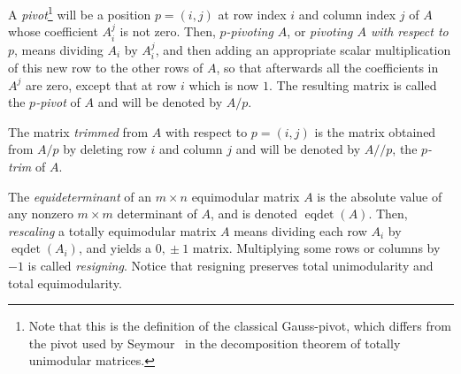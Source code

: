 \documentclass[11pt,a4paper]{amsart}
\theoremstyle{plain}
\theoremstyle{definition}
\DeclareMathOperator{\eqdet}{eqdet}
\newcommand{\trim}{/\!\!/}
\begin{document}
A {\em pivot}\footnote{Note that this is the definition of the classical Gauss-pivot, which differs from the pivot used by Seymour~\cite{Seymour1980} in the decomposition theorem of totally unimodular matrices.} will be a position $p=(i,j)$ at row index $i$ and column index $j$ of $A$ whose coefficient $A_i^j$ is not zero.
Then, {\em $p$-pivoting $A$}, or {\em pivoting $A$ with respect to $p$}, means dividing $A_i$ by $A_i^j$, and then adding an appropriate scalar multiplication of this new row to the other rows of $A$, so that afterwards all the coefficients in $A^j$ are zero, except that at row $i$ which is now $1$.
The resulting matrix is called the {\em $p$-pivot} of $A$ and will be denoted by $A/p$.

The matrix {\em trimmed} from $A$ with respect to $p=(i,j)$ is the matrix obtained from $A/p$ by deleting row $i$ and column $j$ and will be denoted by $A\trim p$, the {\em $p$-trim} of $A$.

The \emph{equideterminant} of an $m\times n$ equimodular matrix $A$ is the absolute value of any nonzero $m\times m$ determinant of $A$, and is denoted $\eqdet(A)$.
Then, \emph{rescaling} a totally equimodular matrix $A$ means dividing each row $A_i$ by $\eqdet(A_i)$, and yields a $0,\!\pm1$ matrix.
Multiplying some rows or columns by $-1$ is called \emph{resigning}.
Notice that resigning preserves total unimodularity and total equimodularity.
\end{document}
